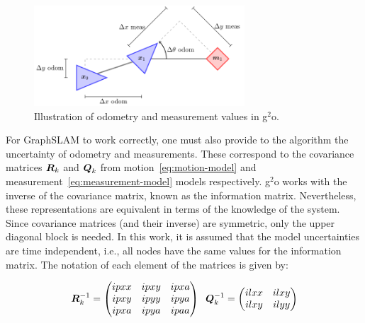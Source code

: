 \begin{figure}[htbp!]
    \centering
    \includegraphics[width=0.7\textwidth]{tikz/protocol.pdf}
    \caption{Illustration of odometry and measurement values in g$^2$o.}
    \label{fig:protocol}
\end{figure}

For GraphSLAM to work correctly, one must also provide to the algorithm the uncertainty of odometry and measurements. These correspond to the covariance matrices $\boldsymbol{R}_k$ and $\boldsymbol{Q}_k$ from motion~\eqref{eq:motion-model} and measurement~\eqref{eq:measurement-model} models respectively. g$^2$o works with the inverse of the covariance matrix, known as the information matrix. Nevertheless, these representations are equivalent in terms of the knowledge of the system. Since covariance matrices (and their inverse) are symmetric, only the upper diagonal block is needed. In this work, it is assumed that the model uncertainties are time independent, i.e., all nodes have the same values for the information matrix. The notation of each element of the matrices is given by:

\begin{equation}
    \boldsymbol{R}^{-1}_k = \begin{pmatrix}
    ipxx & ipxy & ipxa\\
    ipxy & ipyy & ipya\\
    ipxa & ipya & ipaa
    \end{pmatrix} \;\;
    \boldsymbol{Q}^{-1}_k = \begin{pmatrix}
    ilxx & ilxy\\
    ilxy & ilyy
    \end{pmatrix} 
    \label{eq:info-matrices}
\end{equation}

\noindent

